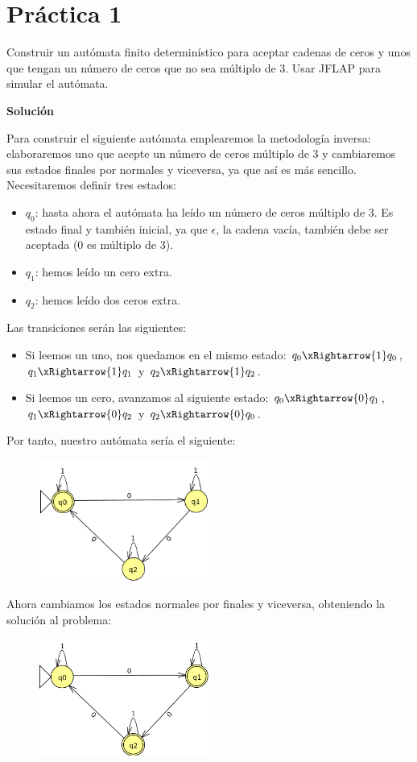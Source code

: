 \documentclass[12pt,spanish]{article}
\newenvironment{solution}{
	\par
	\textbf{Solución}
	\par

}
{
}
\begin{document}
\section{Práctica 1}

Construir un autómata finito determinístico para aceptar cadenas de ceros y unos que tengan un número de ceros que no sea múltiplo de 3. Usar JFLAP para simular el autómata.

\begin{solution}
	Para construir el siguiente autómata emplearemos la metodología inversa: elaboraremos uno que acepte un número de ceros múltiplo de 3 y cambiaremos sus estados finales por normales y viceversa, ya que así es más sencillo.\\
	Necesitaremos definir tres estados:
	\begin{itemize}
		\item $q_0$: hasta ahora el autómata ha leído un número de ceros múltiplo de 3. Es estado final y también inicial, ya que $\epsilon$, la cadena vacía, también debe ser aceptada (0 es múltiplo de 3).
		\item $q_1$: hemos leído un cero extra.
		\item $q_2$: hemos leído dos ceros extra.
	\end{itemize}
	Las transiciones serán las siguientes:
	\begin{itemize}
		\item Si leemos un uno, nos quedamos en el mismo estado: $q_0 \xRightarrow{1} q_0$, $q_1 \xRightarrow{1} q_1$ y $q_2 \xRightarrow{1} q_2$.
		\item Si leemos un cero, avanzamos al siguiente estado: $q_0 \xRightarrow{0} q_1$, $q_1 \xRightarrow{0} q_2$ y $q_2 \xRightarrow{0} q_0$.
	\end{itemize}
	Por tanto, nuestro autómata sería el siguiente:
	\begin{figure}[H]
		\centering
		\includegraphics[width=0.5\textwidth]{p1-1.png}
	\end{figure}
	Ahora cambiamos los estados normales por finales y viceversa, obteniendo la solución al problema:
	\begin{figure}[H]
		\centering
		\includegraphics[width=0.5\textwidth]{p1-2.png}
	\end{figure}
\end{solution}
\end{document}
